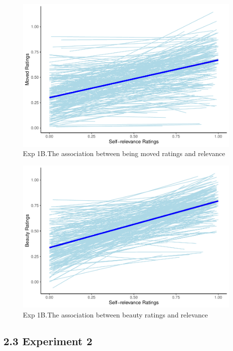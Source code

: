 \documentclass[
  man]{apa6}
\begin{document}
\begin{figure}
\centering
\includegraphics{11_files/figure-latex/unnamed-chunk-3-1.pdf}
\caption{\label{fig:unnamed-chunk-3}Exp 1B.The association between being moved ratings and relevance}
\end{figure}

\begin{figure}
\centering
\includegraphics{11_files/figure-latex/unnamed-chunk-4-1.pdf}
\caption{\label{fig:unnamed-chunk-4}Exp 1B.The association between beauty ratings and relevance}
\end{figure}

\hypertarget{experiment-2}{%
\subsection{2.3 Experiment 2}\label{experiment-2}}
\end{document}
